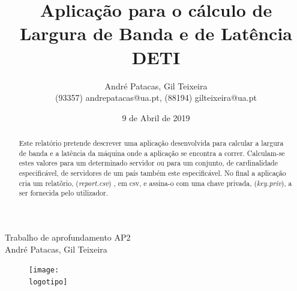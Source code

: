 \documentclass{report}
\begin{document}
%

\def\titulo{Trabalho de aprofundamento AP2}
\def\data{9 de Abril de 2019}
\def\autores{André Patacas, Gil Teixeira}
\def\autorescontactos{(93357) andrepatacas@ua.pt, (88194) gilteixeira@ua.pt}
\def\departamento{DETI}
\def\logotipo{ua.pdf}
%
%
\begin{titlepage}

\begin{center}
%
\vspace*{50mm}
%
{\Huge \titulo}\\ 
%
\vspace{10mm}
%
{\LARGE \autores}\\ 
%
\vspace{30mm}
%
\begin{figure}[h]
\center
\texttt{[image: \\logotipo]}
\end{figure}
%
\vspace{30mm}
\end{center}
%
\begin{flushright}

\end{flushright}
\end{titlepage}

\title{%
{\Huge\textbf{Aplicação para o cálculo de Largura de Banda e de Latência}}\\
{\Large \departamento}
}
%
\author{%
    \autores \\
    \autorescontactos 
}

%
\date{\data}
%
\maketitle







\tableofcontents
\listoftables 
\listoffigures  

\clearpage
{}

\begin{abstract}
Este relatório pretende descrever uma aplicação desenvolvida para calcular a largura de banda e a latência da máquina onde a aplicação se encontra a correr. Calculam-se estes valores para um determinado servidor ou para um conjunto, de cardinalidade especificável, de servidores de um país também este especificável. No final a aplicação cria um relatõrio, (\textit{report.csv}) , em csv, e assina-o com uma chave privada, (\textit{key.priv}), a ser fornecida pelo utilizador.

\end{abstract}
\end{document}
